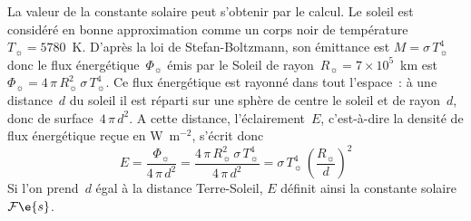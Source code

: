 \sk
La valeur de la constante solaire peut s'obtenir par le calcul. Le soleil est considéré en bonne approximation comme un corps noir de température~$T_{\sun} = 5780$~K. D'après la loi de Stefan-Boltzmann, son émittance est $M = \sigma \, T_{\sun}^4$ donc le flux énergétique~$\Phi_{\sun}$ émis par le Soleil de rayon~$R_{\sun} = 7 \times 10^5$~km est~$\Phi_{\sun} = 4 \, \pi \, R_{\sun}^2 \, \sigma \, T_{\sun}^4$. Ce flux énergétique est rayonné dans tout l'espace~: à une distance~$d$ du soleil il est réparti sur une sphère de centre le soleil et de rayon~$d$, donc de surface~$4 \, \pi \, d^2$. A cette distance, l'éclairement~$E$, c'est-à-dire la densité de flux énergétique reçue en W~m$^{-2}$, s'écrit donc
\[ E = \frac{\Phi_{\sun}}{4 \, \pi \, d^2} = \frac{4 \, \pi \, R_{\sun}^2 \, \sigma \, T_{\sun}^4}{4 \, \pi \, d^2} = \sigma \, T_{\sun}^4 \, \left( \frac{R_{\sun}}{d} \right)^2 \]
Si l'on prend~$d$ égal à la distance Terre-Soleil, $E$ définit ainsi la constante solaire~$\mathcal{F}\e{s}$.

